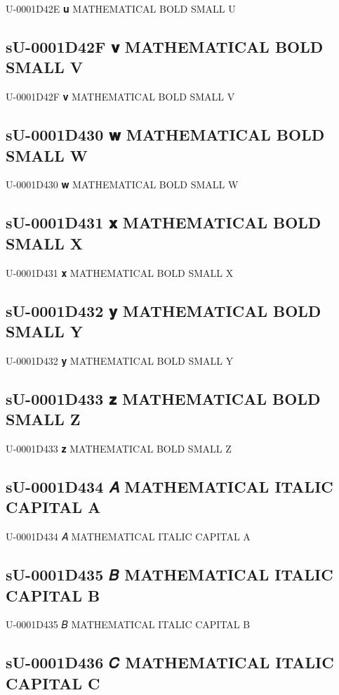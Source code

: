 U-0001D42E 𝐮 MATHEMATICAL BOLD SMALL U

\subsection{sU-0001D42F 𝐯 MATHEMATICAL BOLD SMALL V}

U-0001D42F 𝐯 MATHEMATICAL BOLD SMALL V

\subsection{sU-0001D430 𝐰 MATHEMATICAL BOLD SMALL W}

U-0001D430 𝐰 MATHEMATICAL BOLD SMALL W

\subsection{sU-0001D431 𝐱 MATHEMATICAL BOLD SMALL X}

U-0001D431 𝐱 MATHEMATICAL BOLD SMALL X

\subsection{sU-0001D432 𝐲 MATHEMATICAL BOLD SMALL Y}

U-0001D432 𝐲 MATHEMATICAL BOLD SMALL Y

\subsection{sU-0001D433 𝐳 MATHEMATICAL BOLD SMALL Z}

U-0001D433 𝐳 MATHEMATICAL BOLD SMALL Z

\subsection{sU-0001D434 𝐴 MATHEMATICAL ITALIC CAPITAL A}

U-0001D434 𝐴 MATHEMATICAL ITALIC CAPITAL A

\subsection{sU-0001D435 𝐵 MATHEMATICAL ITALIC CAPITAL B}

U-0001D435 𝐵 MATHEMATICAL ITALIC CAPITAL B

\subsection{sU-0001D436 𝐶 MATHEMATICAL ITALIC CAPITAL C}

